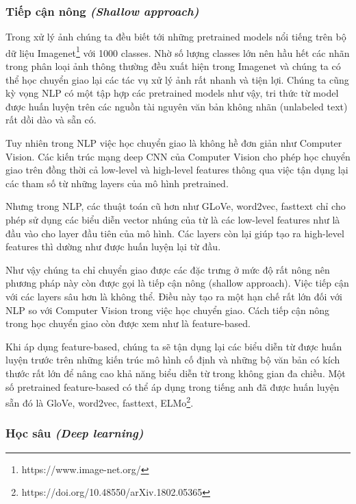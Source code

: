 \subsubsection{Tiếp cận nông \textit{(Shallow approach)}}
Trong xử lý ảnh chúng ta đều biết tới những pretrained models nổi tiếng trên bộ dữ liệu Imagenet\footnote{https://www.image-net.org/} với 1000 classes. Nhờ số lượng classes lớn nên hầu hết các nhãn trong phân loại ảnh thông thường đều xuất hiện trong Imagenet và chúng ta có thể học chuyển giao lại các tác vụ xử lý ảnh rất nhanh và tiện lợi. Chúng ta cũng kỳ vọng NLP có một tập hợp các pretrained models như vậy, tri thức từ model được huấn luyện trên các nguồn tài nguyên văn bản không nhãn (unlabeled text) rất dồi dào và sẵn có\cite{webpage20}.

Tuy nhiên trong NLP việc học chuyển giao là không hề đơn giản như Computer Vision. Các kiến trúc mạng deep CNN của Computer Vision cho phép học chuyển giao trên đồng thời cả low-level và high-level features thông qua việc tận dụng lại các tham số từ những layers của mô hình pretrained.

Nhưng trong NLP, các thuật toán cũ hơn như GLoVe, word2vec, fasttext chỉ cho phép sử dụng các biểu diễn vector nhúng của từ là các low-level features như là đầu vào cho layer đầu tiên của mô hình. Các layers còn lại giúp tạo ra high-level features thì dường như được huấn luyện lại từ đầu.

Như vậy chúng ta chỉ chuyển giao được các đặc trưng ở mức độ rất nông nên phương pháp này còn được gọi là tiếp cận nông (shallow approach). Việc tiếp cận với các layers sâu hơn là không thể. Điều này tạo ra một hạn chế rất lớn đối với NLP so với Computer Vision trong việc học chuyển giao. Cách tiếp cận nông trong học chuyển giao còn được xem như là feature-based.

Khi áp dụng feature-based, chúng ta sẽ tận dụng lại các biểu diễn từ được huấn luyện trước trên những kiến trúc mô hình cố định và những bộ văn bản có kích thước rất lớn để nâng cao khả năng biểu diễn từ trong không gian đa chiều. Một số pretrained feature-based có thể áp dụng trong tiếng anh đã được huấn luyện sẵn đó là GloVe, word2vec, fasttext, ELMo\footnote{https://doi.org/10.48550/arXiv.1802.05365}.

\subsubsection{Học sâu \textit{(Deep learning)}}

